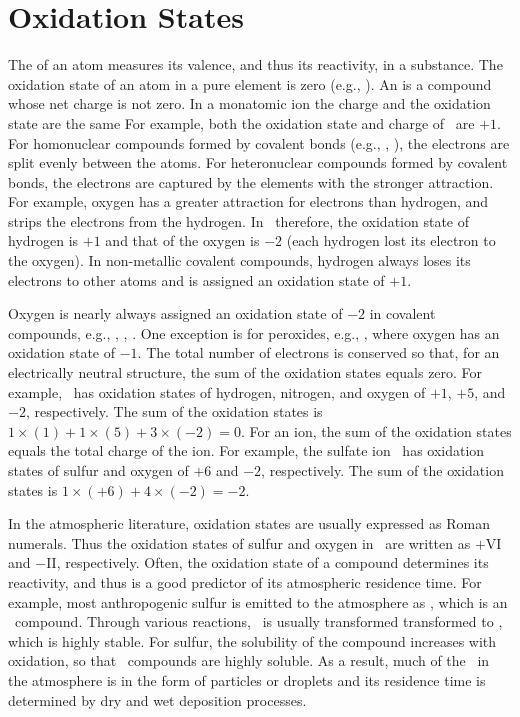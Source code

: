 \documentclass[12pt,twoside]{book}
\newcounter{reaction} %
\begin{document}
\section[Oxidation States]{Oxidation States}
The  of an atom measures its valence, and thus
its reactivity, in a substance.
The oxidation state of an atom in a pure element is zero (e.g., \Ar).
An  is a compound whose net charge is not zero.
In a monatomic ion the charge and the oxidation state are the same
For example, both the oxidation state and charge of \Hp\ are $+1$.
For homonuclear compounds formed by covalent bonds (e.g., \Nd, \Od),
the electrons are split evenly between the atoms.
For heteronuclear compounds formed by covalent bonds, the electrons
are captured by the elements with the stronger attraction.
For example, oxygen has a greater attraction for electrons than
hydrogen, and strips the electrons from the hydrogen.
In \HdO\, therefore, the oxidation state of hydrogen is $+1$ and that
of the oxygen is $-2$ (each hydrogen lost its electron to the oxygen).  
In non-metallic covalent compounds, hydrogen always loses its
electrons to other atoms and is assigned an oxidation state of $+1$.

Oxygen is nearly always assigned an oxidation state of $-2$ in
covalent compounds, e.g., \SOd, \NOd, \COd. 
One exception is for peroxides, e.g., \HdOd, where oxygen has an
oxidation state of $-1$.
The total number of electrons is conserved so that, for an
electrically neutral structure, the sum of the oxidation states equals
zero. 
For example, \HNOt\ has oxidation states of hydrogen, nitrogen, and
oxygen of $+1$, $+5$, and $-2$, respectively.
The sum of the oxidation states is 
$1 \times (1) + 1 \times (5) + 3 \times (-2) = 0$.
For an ion, the sum of the oxidation states equals the total charge of
the ion.
For example, the sulfate ion \SOqdm\ has oxidation states of
sulfur and oxygen of $+6$ and $-2$, respectively.
The sum of the oxidation states is $1 \times (+6) + 4 \times (-2) = -2$.

In the atmospheric literature, oxidation states are usually expressed
as Roman numerals.
Thus the oxidation states of sulfur and oxygen in \SOqdm\ are written
as $+$VI and $-$II, respectively. 
Often, the oxidation state of a compound determines its reactivity,
and thus is a good predictor of its atmospheric residence time.
For example, most anthropogenic sulfur is emitted to the atmosphere as
\SOd, which is an \SIV\ compound.
Through various  reactions, \SIV\ is usually
transformed transformed to \SVI, which is highly stable.
For sulfur, the solubility of the compound increases with oxidation,
so that \SVI\ compounds are highly soluble. 
As a result, much of the \SVI\ in the atmosphere is in the form of
particles or droplets and its residence time is determined by dry and
wet deposition processes.
\end{document}

